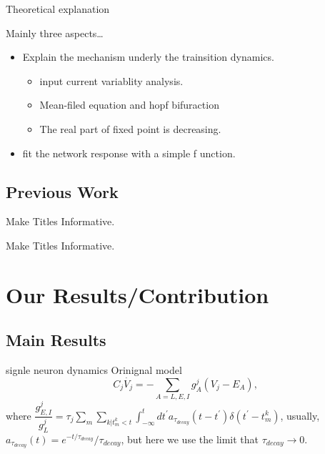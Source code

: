 \documentclass{beamer}
\begin{document}
\begin{frame}{Theoretical explanation}

  Mainly three aspects\ldots
  \begin{itemize}
  \item Explain the mechanism underly the trainsition dynamics.
    \begin{itemize}
    \item 
    input current variablity analysis.
    \item
      Mean-filed equation and hopf bifuraction
    \item    
      The real part of fixed point is decreasing.
    \end{itemize}
  \item
   fit the network response with a simple f unction.
  \end{itemize}
\end{frame}


\subsection{Previous Work}

\begin{frame}{Make Titles Informative.}
\end{frame}

\begin{frame}{Make Titles Informative.}
\end{frame}



\section{Our Results/Contribution}

\subsection{Main Results}
\begin{frame}{signle neuron dynamics}
	Orinignal model
	\begin{equation*}
		C_{j} \dot{V_{j}}  = - \sum_{A=L, E, I}g_{A}^{j}(V_{j} - E_{A}),
	\end{equation*}
	where $\dfrac{g_{E, I}^{j}}{g_{L}^{j}}=\tau_{j}\sum_{m} \sum_{k|t_{m}^{k}<t}\int_{-\infty}^{t}dt^{\prime}a_{\tau_{decay}}\left(t - t^{\prime}\right) \delta(t^{\prime}-t_{m}^{k})$, usually, $a_{\tau_{decay}}(t)=e^{-t / \tau_{decay}} / \tau_{decay}$, but here we use the limit that $\tau_{decay} \rightarrow 0$.
\end{frame}
\end{document}
